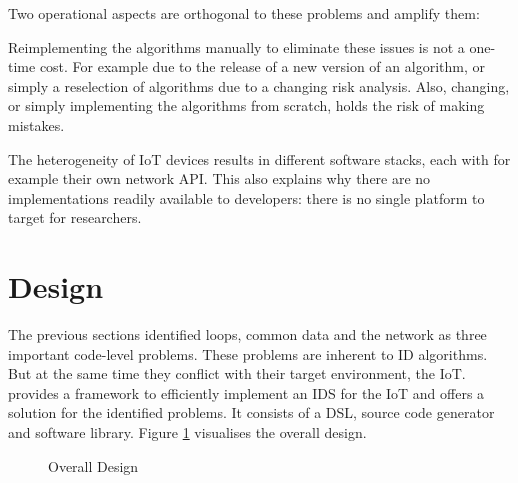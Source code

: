 \documentclass[conference]{IEEEtran}
\begin{document}
\bigskip
Two operational aspects are orthogonal to these problems and amplify them:

\begin{LaTeXdescription}
  
  \item[Reimplementing] the algorithms manually to eliminate these issues is
  not a one-time cost. For example due to the release of a new version of an
  algorithm, or simply a reselection of algorithms due to a changing risk
  analysis. Also, changing, or simply implementing the algorithms from scratch,
  holds the risk of making mistakes.

  \item[The heterogeneity of IoT devices] results in different software stacks,
  each with for example their own network API\@. This also explains why there
  are no implementations readily available to developers: there is no single
  platform to target for researchers.

\end{LaTeXdescription}

\section{Design}
\label{design}

The previous sections identified loops, common data and the network as three
important code-level problems. These problems are inherent to ID algorithms.
But at the same time they conflict with their target environment, the IoT\@.
\NAME provides a framework to efficiently implement an IDS for the IoT and
offers a solution for the identified problems. It consists of a DSL, source
code generator and software library. Figure \ref{fig:design} visualises the
overall design.

\begin{figure}[ht]
  \centering
\caption{Overall Design}
\label{fig:design}
\end{figure}
\end{document}
